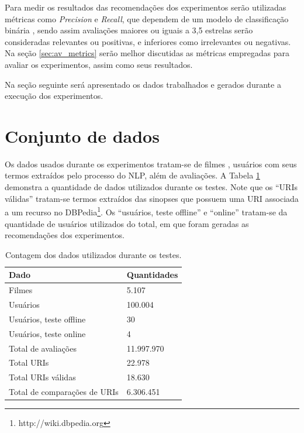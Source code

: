 Para medir os resultados das recomendações dos experimentos serão utilizadas métricas como \textit{Precision} e \textit{Recall}, que dependem de um modelo de classificação binária \citep{Powers_2008}, sendo assim avaliações maiores ou iguais a 3,5 estrelas serão consideradas relevantes ou positivas, e inferiores como irrelevantes ou negativas. Na seção \ref{sec:av_metrics} serão melhor discutidas as métricas empregadas para avaliar os experimentos, assim como seus resultados.

Na seção seguinte será apresentado os dados trabalhados e gerados durante a execução dos experimentos.

\section{Conjunto de dados}
\label{sec:av_data_set}

Os dados usados durante os experimentos tratam-se de filmes , usuários com seus termos extraídos pelo processo do \ac{NLP}, além de avaliações. A Tabela \ref{tab:dataset} demonstra a quantidade de dados utilizados durante os testes. Note que os \enquote{URIs válidas} tratam-se termos extraídos das sinopses que possuem uma \ac{URI} associada a um recurso no DBPedia\footnote{http://wiki.dbpedia.org}. Os \enquote{usuários, teste offline} e \enquote{online} tratam-se da quantidade de usuários utilizados do total, em que foram geradas as recomendações dos experimentos.

\begin{table}[H]
\centering
\def\arraystretch{1.3}
\begin{tabular}{|l|l|}
	\hline
	\textbf{Dado}          & \textbf{Quantidades}   \\ \hline
	Filmes                 & 5.107                  \\ \hline
	Usuários               & 100.004                \\ \hline
	Usuários, teste offline & 30					\\ \hline
	Usuários, teste online & 4						\\ \hline
	Total de avaliações       & 11.997.970          \\ \hline
	Total URIs             & 22.978                 \\ \hline
	Total URIs válidas     & 18.630                 \\ \hline
	Total de comparações de URIs & 6.306.451        \\ \hline
\end{tabular}
\caption{Contagem dos dados utilizados durante os testes.}
\label{tab:dataset}
\end{table}

